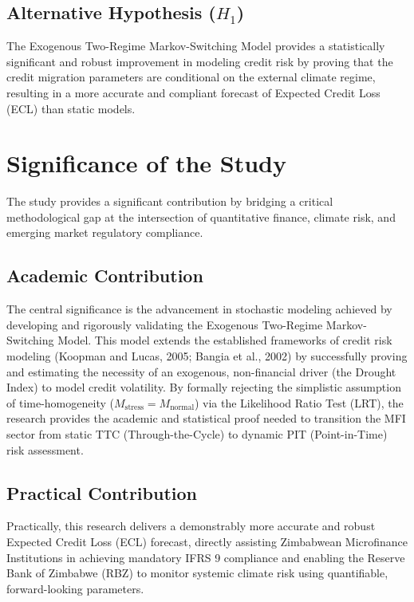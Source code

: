 \documentclass[12pt,a4paper]{article}
\newcommand{\Mnormal}{M_{\text{normal}}}
\newcommand{\Mstress}{M_{\text{stress}}}
\begin{document}
\subsection{Alternative Hypothesis ($H_1$)}

The Exogenous Two-Regime Markov-Switching Model provides a statistically significant and robust improvement in modeling credit risk by proving that the credit migration parameters are conditional on the external climate regime, resulting in a more accurate and compliant forecast of Expected Credit Loss (ECL) than static models.

\section{Significance of the Study}

The study provides a significant contribution by bridging a critical methodological gap at the intersection of quantitative finance, climate risk, and emerging market regulatory compliance.

\subsection{Academic Contribution}

The central significance is the advancement in stochastic modeling achieved by developing and rigorously validating the Exogenous Two-Regime Markov-Switching Model. This model extends the established frameworks of credit risk modeling (Koopman and Lucas, 2005; Bangia et al., 2002) by successfully proving and estimating the necessity of an exogenous, non-financial driver (the Drought Index) to model credit volatility. By formally rejecting the simplistic assumption of time-homogeneity ($\Mstress = \Mnormal$) via the Likelihood Ratio Test (LRT), the research provides the academic and statistical proof needed to transition the MFI sector from static TTC (Through-the-Cycle) to dynamic PIT (Point-in-Time) risk assessment.

\subsection{Practical Contribution}

Practically, this research delivers a demonstrably more accurate and robust Expected Credit Loss (ECL) forecast, directly assisting Zimbabwean Microfinance Institutions in achieving mandatory IFRS 9 compliance and enabling the Reserve Bank of Zimbabwe (RBZ) to monitor systemic climate risk using quantifiable, forward-looking parameters.
\end{document}
